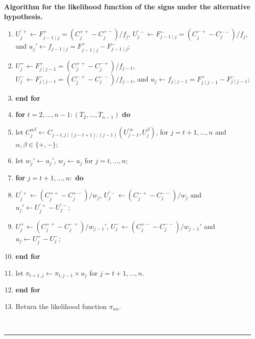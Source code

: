 \documentclass[harvard,11pt]{article}
\newenvironment{proof}[1][Proof]{\textbf{#1.} }{\  \rule{0.5em}{0.5em}}
\begin{document}
\begin{proof}[Algorithm for the likelihood function of the signs under the alternative hypothesis]
\begin{enumerate}
\item \hspace{10pt} \parbox[t]{\linegoal}{$U_j^{'+}\leftarrow F_{j-1\mid j}^{+}=\left(C^{++}_j-C^{+-}_j\right)/f_j$, $U_j^{'-}\leftarrow F_{j-1\mid j}^{-}=\left(C^{-+}_j-C^{--}_j\right)/f_j$, and $u_j'\leftarrow f_{j-1\mid j}=F_{j-1\mid j}^{+}-F_{j-1\mid j}^{-}$;}
\item \hspace{10pt} \parbox[t]{\linegoal}{$U_j^{+}\leftarrow F_{j\mid j-1}^{+}=\left(C^{++}_j-C^{-+}_j\right)/f_{j-1}$, $U_j^{-}\leftarrow F_{j\mid j-1}^{-}=\left(C^{-+}_j-C^{--}_j\right)/f_{j-1}$, and $u_j\leftarrow f_{j\mid j-1}=F_{j\mid j-1}^{+}-F_{j\mid j-1}^{-}$;}
\item \textbf{end for}
\item \textbf{for} $t=2,...,n-1: \left(T_2,...,T_{n-1}\right)$ \textbf{do}
\item\hspace{10pt} let $C^{\alpha\beta}_j\leftarrow C_{j-t,j\mid (j-t+1):(j-1)}\left(U^{'\alpha}_{j-1},U^{\beta}_j\right)$, for $j=t+1,...,n$ and $\alpha,\beta\in\{+,-\}$; 
\item\hspace{10pt} let $w_{j}'\leftarrow u_{j}'$, $w_{j}\leftarrow u_{j}$ for $j=t,...,n;$
\item\hspace{10pt} \textbf{for} $j=t+1,...,n:$ \textbf{do}
\item\hspace{30pt} $U^{'+}_{j}\leftarrow \left(C^{++}_j-C^{+-}_j\right)/w_j$, $U^{'-}_{j}\leftarrow \left(C^{-+}_j-C^{--}_j\right)/w_j$ and $u_j'\leftarrow U^{'+}_{j}-U^{'-}_{j}$;
\item\hspace{30pt} $U^{+}_{j}\leftarrow \left(C^{++}_j-C^{-+}_j\right)/w_{j-1}'$, $U^{-}_{j}\leftarrow \left(C^{+-}_j-C^{--}_j\right)/w_{j-1}'$ and $u_j\leftarrow U^{+}_{j}-U^{-}_{j}$;
\item\hspace{10pt} \textbf{end for}
\item\hspace{10pt} let $\pi_{t+1,j}\leftarrow \pi_{t,j-1}\times u_j$ for $j=t+1,...,n$.
\item\textbf{end for}
\item Return the likelihood function $\pi_{nn}$.
\end{enumerate}
\end{proof}
\end{document}
